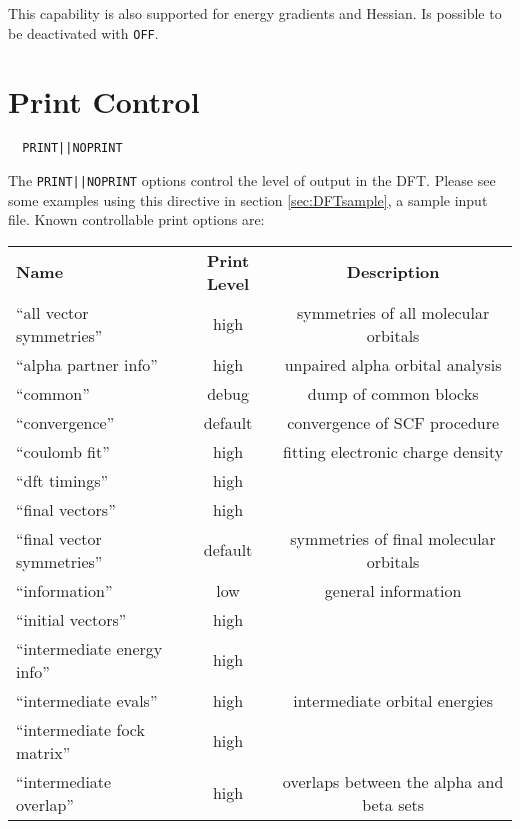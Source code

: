 This capability is also supported for energy gradients and Hessian.
Is possible to be deactivated with \verb+OFF+.

\section{Print Control}
\begin{verbatim}
  PRINT||NOPRINT
\end{verbatim}

The \verb+PRINT||NOPRINT+ options control the level of output in the
DFT.  Please see some examples using this directive in
section  \ref{sec:DFTsample}, a sample input file.
  Known controllable print options are:

\begin{table}[htbp]
\begin{center}
\begin{tabular}{lcc}
  {\bf Name}          & {\bf Print Level} & {\bf Description} \\
 ``all vector symmetries''          & high        & symmetries of all molecular orbitals \\
 ``alpha partner info''             & high        & unpaired alpha orbital analysis \\
 ``common''                         & debug       & dump of common blocks \\
 ``convergence''                    & default     & convergence of SCF procedure \\
 ``coulomb fit''                    & high        & fitting electronic charge density \\
 ``dft timings''                    & high        & \\
 ``final vectors''                  & high        & \\
 ``final vector symmetries''        & default     & symmetries of final molecular orbitals \\
 ``information''                    & low         & general information  \\
 ``initial vectors''                & high        & \\
 ``intermediate energy info''       & high        & \\
 ``intermediate evals''             & high        & intermediate orbital energies \\
 ``intermediate fock matrix''       & high        & \\
 ``intermediate overlap''           & high        & overlaps between the alpha and beta sets \\

\end{tabular}
\end{center}
\end{table}

